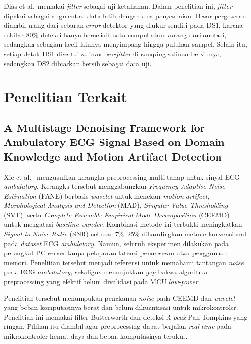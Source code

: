 Dias et al.\ memakai \textit{jitter} sebagai uji ketahanan. Dalam penelitian ini, \textit{jitter} dipakai sebagai augmentasi data latih dengan dua penyesuaian. Besar pergeseran diambil ulang dari sebaran \textit{error} detektor yang diukur sendiri pada DS1, karena sekitar 80\% deteksi hanya berselisih satu sampel atau kurang dari anotasi, sedangkan sebagian kecil lainnya menyimpang hingga puluhan sampel. Selain itu, setiap detak DS1 disertai salinan ber-\textit{jitter} di samping salinan bersihnya, sedangkan DS2 dibiarkan bersih sebagai data uji.

\section{Penelitian Terkait}

\subsection{A Multistage Denoising Framework for Ambulatory ECG Signal Based on Domain Knowledge and Motion Artifact Detection}

Xie et al.~\cite{xie_2021} mengusulkan kerangka preprocessing multi-tahap untuk sinyal ECG \textit{ambulatory}. Kerangka tersebut menggabungkan \textit{Frequency-Adaptive Noise Estimation} (FANE) berbasis \textit{wavelet} untuk menekan \textit{motion artifact}, \textit{Morphological Analysis and Detection} (MAD), \textit{Singular Value Thresholding} (SVT), serta \textit{Complete Ensemble Empirical Mode Decomposition} (CEEMD) untuk mengatasi \textit{baseline wander}. Kombinasi metode ini terbukti meningkatkan \textit{Signal-to-Noise Ratio} (SNR) sebesar 7\%--25\% dibandingkan metode konvensional pada \textit{dataset} ECG \textit{ambulatory}. Namun, seluruh eksperimen dilakukan pada perangkat PC server tanpa pelaporan latensi pemrosesan atau penggunaan memori. Penelitian tersebut menjadi referensi untuk memahami tantangan \textit{noise} pada ECG \textit{ambulatory}, sekaligus menunjukkan \textit{gap} bahwa algoritma preprocessing yang efektif belum divalidasi pada MCU \textit{low-power}.

Penelitian tersebut menumpukan penekanan \textit{noise} pada CEEMD dan \textit{wavelet} yang beban komputasinya berat dan belum dikuantisasi untuk mikrokontroler. Penelitian ini memakai filter Butterworth dan deteksi R-\textit{peak} Pan-Tompkins yang ringan. Pilihan itu diambil agar preprocessing dapat berjalan \textit{real-time} pada mikrokontroler hemat daya dan beban komputasinya terukur.

